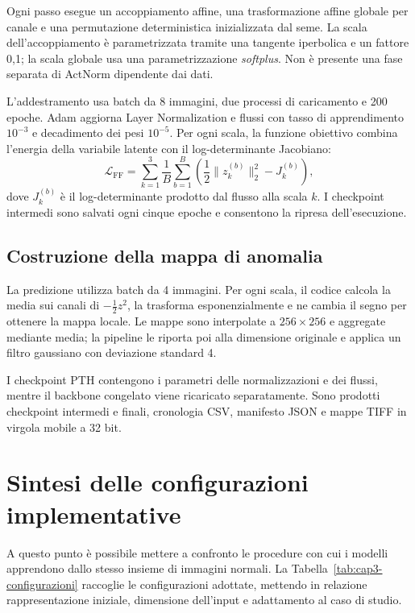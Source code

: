 Ogni passo esegue un accoppiamento affine, una trasformazione affine globale per canale e una permutazione deterministica inizializzata dal seme. La scala dell'accoppiamento è parametrizzata tramite una tangente iperbolica e un fattore 0,1; la scala globale usa una parametrizzazione \textit{softplus}. Non è presente una fase separata di ActNorm dipendente dai dati.

L'addestramento usa batch da 8 immagini, due processi di caricamento e 200 epoche. Adam aggiorna Layer Normalization e flussi con tasso di apprendimento $10^{-3}$ e decadimento dei pesi $10^{-5}$. Per ogni scala, la funzione obiettivo combina l'energia della variabile latente con il log-determinante Jacobiano:
\begin{equation}
    \mathcal{L}_{\mathrm{FF}}=
    \sum_{k=1}^{3}\frac{1}{B}\sum_{b=1}^{B}
    \left(\frac{1}{2}\lVert z_k^{(b)}\rVert_2^2-J_k^{(b)}\right),
\end{equation}
dove $J_k^{(b)}$ è il log-determinante prodotto dal flusso alla scala $k$. I checkpoint intermedi sono salvati ogni cinque epoche e consentono la ripresa dell'esecuzione.

\subsection{Costruzione della mappa di anomalia}

La predizione utilizza batch da 4 immagini. Per ogni scala, il codice calcola la media sui canali di $-\tfrac{1}{2}z^2$, la trasforma esponenzialmente e ne cambia il segno per ottenere la mappa locale. Le mappe sono interpolate a $256\times256$ e aggregate mediante media; la pipeline le riporta poi alla dimensione originale e applica un filtro gaussiano con deviazione standard 4.

I checkpoint PTH contengono i parametri delle normalizzazioni e dei flussi, mentre il backbone congelato viene ricaricato separatamente. Sono prodotti checkpoint intermedi e finali, cronologia CSV, manifesto JSON e mappe TIFF in virgola mobile a 32 bit.

\section{Sintesi delle configurazioni implementative}
\label{sec:cap3-sintesi}

A questo punto è possibile mettere a confronto le procedure con cui i modelli apprendono dallo stesso insieme di immagini normali. La Tabella~\ref{tab:cap3-configurazioni} raccoglie le configurazioni adottate, mettendo in relazione rappresentazione iniziale, dimensione dell’input e adattamento al caso di studio.

